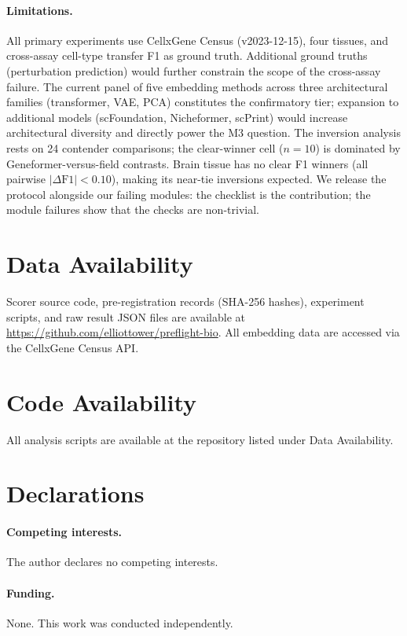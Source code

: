 \documentclass[11pt]{article}
\begin{document}
\paragraph{Limitations.} All primary experiments use CellxGene Census (v2023-12-15), four tissues, and cross-assay cell-type transfer F1 as ground truth. Additional ground truths (perturbation prediction) would further constrain the scope of the cross-assay failure. The current panel of five embedding methods across three architectural families (transformer, VAE, PCA) constitutes the confirmatory tier; expansion to additional models (scFoundation, Nicheformer, scPrint) would increase architectural diversity and directly power the M3 question. The inversion analysis rests on 24 contender comparisons; the clear-winner cell ($n = 10$) is dominated by Geneformer-versus-field contrasts. Brain tissue has no clear F1 winners (all pairwise $|\Delta\text{F1}| < 0.10$), making its near-tie inversions expected. We release the protocol alongside our failing modules: the checklist is the contribution; the module failures show that the checks are non-trivial.

\section*{Data Availability}

Scorer source code, pre-registration records (SHA-256 hashes), experiment scripts, and raw result JSON files are available at \url{https://github.com/elliottower/preflight-bio}. All embedding data are accessed via the CellxGene Census API.

\section*{Code Availability}

All analysis scripts are available at the repository listed under Data Availability.

\section*{Declarations}

\paragraph{Competing interests.} The author declares no competing interests.

\paragraph{Funding.} None. This work was conducted independently.
\end{document}

